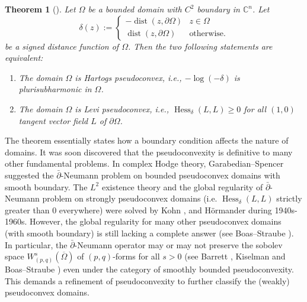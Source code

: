 \documentclass[11pt]{article}
\theoremstyle{plain} \numberwithin{equation}{section}
\newtheorem{theorem}{Theorem}[section]
\theoremstyle{definition}
\DeclareMathOperator{\Hessian}{Hess}
\DeclareMathOperator{\distance}{dist}
\begin{document}
	\begin{theorem}[\citep{Kr01}]
		Let $\Omega$ be a bounded domain with $C^2$ boundary in $\mathbb{C}^n$. Let \[\delta(z):=\begin{cases}
		-\distance(z, \partial\Omega) & z\in\Omega\\
		\distance(z, \partial\Omega) & \text{otherwise}.
		\end{cases}\]  be a \textit{signed distance function} of $\Omega$. Then the two following statements are equivalent:
		\begin{enumerate}
			\item The domain $\Omega$ is Hartogs pseudoconvex, i.e., $-\log(-\delta)$ is plurisubharmonic in $\Omega$.
			\item The domain $\Omega$ is Levi pseudoconvex, i.e., $\Hessian_\delta (L, L)\geq 0$ for all $(1,0)$ tangent vector field $L$ of $\partial\Omega$.
		\end{enumerate}
	\end{theorem}

The theorem essentially states how a boundary condition affects the nature of domains. It was soon discovered that the pseudoconvexity is definitive to many other fundamental problems. In complex Hodge theory, Garabedian--Spencer \citep{GS52} suggested the $\bar{\partial}$-Neumann problem on bounded pseudoconvex domains with smooth boundary. The $L^2$ existence theory and the global regularity of $\bar{\partial}$-Neumann problem on strongly pseudoconvex domains (i.e. $\Hessian_\delta (L, L)$ strictly greater than $0$ everywhere) were solved by Kohn \citep{Ko63}, \citep{Ko64} and H\"{o}rmander \citep{Ho65} during 1940s-1960s. However, the global regularity for many other pseudoconvex domains (with smooth boundary) is still lacking a complete answer (see Boas--Straube \citep{BS99}). In particular, the $\bar{\partial}$-Neumann operator may or may not preserve the sobolev space $W^s_{(p, q)}(\overline{\Omega})$ of $(p,q)$-forms for all $s>0$ (see Barrett \citep{Ba92},  Kiselman \citep{Ki91} and Boas--Straube \citep{BS93}) even under the category of smoothly bounded pseudoconvexity. This demands a refinement of pseudoconvexity to further classify the (weakly) pseudoconvex domains.
\end{document}
